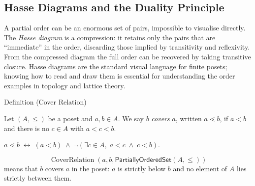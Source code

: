 
\subsection{Hasse Diagrams and the Duality Principle}\label{sec:hasse-duality}


\begin{exposition}
A partial order can be an enormous set of pairs, impossible to visualise
directly.  The \emph{Hasse diagram} is a compression: it retains only the
pairs that are ``immediate'' in the order, discarding those implied by
transitivity and reflexivity.  From the compressed diagram the full order
can be recovered by taking transitive closure.  Hasse diagrams are the
standard visual language for finite posets; knowing how to read and draw them
is essential for understanding the order examples in topology and lattice theory.
\end{exposition}


\begin{definitionbox}{Definition (Cover Relation)}
\begin{definition}\label{def:cover-relation}
Let $(A, \leq)$ be a poset and $a, b \in A$.  We say $b$ \emph{covers} $a$,
written $a \lessdot b$, if $a < b$ and there is no $c \in A$ with
$a < c < b$.
\end{definition}
\end{definitionbox}

\begin{remark*}
$a \lessdot b \;\leftrightarrow\; (a < b) \;\wedge\;
\neg(\exists c \in A,\; a < c \;\wedge\; c < b)$.
\end{remark*}

\begin{remark*}
\[
  \operatorname{CoverRelation}(a,b,\mathsf{PartiallyOrderedSet}(A,\leq))
\]
means that $b$ covers $a$ in the poset: $a$ is strictly below $b$ and no
element of $A$ lies strictly between them.
\end{remark*}

